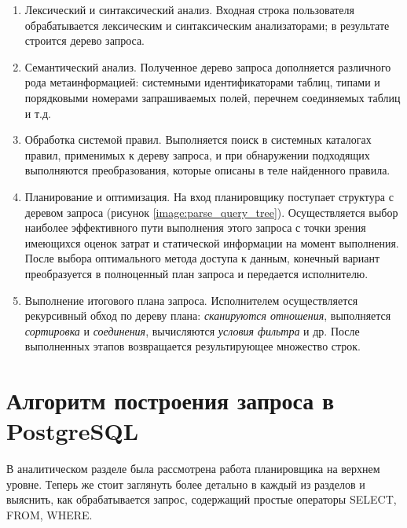 \begin{enumerate}
	\item Лексический и синтаксический анализ. Входная строка пользователя обрабатывается лексическим и синтаксическим анализаторами; в результате строится дерево запроса.
	\vspace{-0.2cm}
	\item Семантический анализ. Полученное дерево запроса дополняется различного рода метаинформацией: системными идентификаторами таблиц, типами и порядковыми номерами запрашиваемых полей, перечнем соединяемых таблиц и т.д.
	\vspace{-0.2cm}
	\item Обработка системой правил. Выполняется поиск в системных каталогах правил, применимых к дереву запроса, и при обнаружении подходящих выполняются преобразования, которые описаны в теле найденного правила.
	\vspace{-0.2cm}
	\item Планирование и оптимизация. На вход планировщику поступает структура с деревом запроса (рисунок \ref{image:parse_query_tree}). Осуществляется выбор наиболее эффективного пути выполнения этого запроса с точки зрения имеющихся оценок затрат и статической информации на момент выполнения.  После выбора оптимального метода доступа к данным, конечный вариант преобразуется в полноценный план запроса и передается исполнителю. 
	\vspace{-0.2cm}
	\item Выполнение итогового плана запроса. Исполнителем осуществляется рекурсивный обход по дереву плана: \textit{сканируются отношения}, выполняется \textit{сортировка} и \textit{соединения}, вычисляются \textit{условия фильтра} и др. После выполненных этапов возвращается результирующее множество строк.
\end{enumerate}

\section{Алгоритм построения запроса в PostgreSQL}
\vspace{-0.5cm}
В аналитическом разделе была рассмотрена работа планировщика на верхнем уровне. Теперь же стоит заглянуть более детально в каждый из разделов и выяснить, как обрабатывается запрос, содержащий простые операторы SELECT, FROM, WHERE. 

